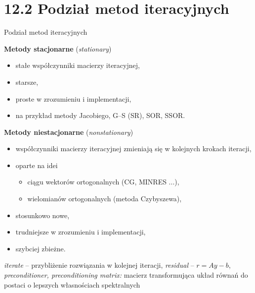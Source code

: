 \section{12.2 Podział metod iteracyjnych}

\begin{frame}{Podział metod iteracyjnych}
  \begin{block}{\textbf{Metody stacjonarne} (\emph{stationary})}
    \begin{itemize}
      \item stałe współczynniki macierzy iteracyjnej,
      \item starsze,
      \item proste w zrozumieniu i implementacji,
      \item na przykład metody Jacobiego, G--S (SR), SOR, SSOR.
    \end{itemize}
  \end{block}
\end{frame}

\begin{frame}{}
  \begin{block}{\textbf{Metody niestacjonarne} (\emph{nonstationary})}
    \begin{itemize}
      \item współczynniki macierzy iteracyjnej zmieniają się w kolejnych krokach iteracji,
      \item oparte na idei
      \begin{itemize}
        \item ciągu wektorów ortogonalnych (CG, MINRES ...),
        \item wielomianów ortogonalnych (metoda Czybyszewa),
      \end{itemize}
      \item stosunkowo nowe,
      \item trudniejsze w zrozumieniu i implementacji,
      \item szybciej zbieżne.
    \end{itemize}
  \end{block}
\end{frame}

\begin{frame}{}
  \begin{block}{}
    \emph{iterate} -- przybliżenie rozwiązania w kolejnej iteracji,
    \newline \emph{residual} -- $r=Ay-b$,
    \newline \emph{preconditioner, preconditioning matrix:} macierz transformująca układ równań do postaci o lepszych własnościach spektralnych
  \end{block}
\end{frame}
